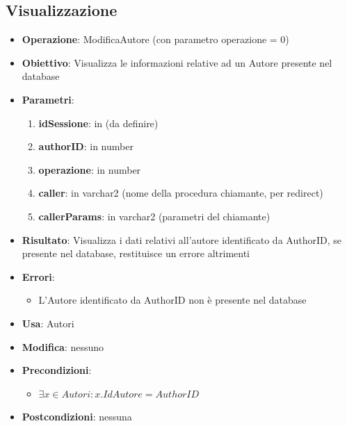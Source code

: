 \documentclass[a4paper,11pt]{article}
\begin{document}
\subsection{Visualizzazione}
\begin{itemize}
	\item \textbf{Operazione}: ModificaAutore (con parametro operazione = 0)
	\item \textbf{Obiettivo}: Visualizza le informazioni relative ad un Autore presente nel database
	\item \textbf{Parametri}:
	\begin{enumerate}
		\item \textbf{idSessione}: in (da definire)
		\item \textbf{authorID}: in number
		\item \textbf{operazione}: in number
		\item \textbf{caller}: in varchar2 (nome della procedura chiamante, per redirect)
		\item \textbf{callerParams}: in varchar2 (parametri del chiamante)
	\end{enumerate}
	\item \textbf{Risultato}: Visualizza i dati relativi all'autore identificato da AuthorID, se presente nel database, restituisce un errore altrimenti
	\item \textbf{Errori}: 
	\begin{itemize}
		\item L'Autore identificato da AuthorID non è presente nel database
	\end{itemize}
	\item \textbf{Usa}: Autori
	\item \textbf{Modifica}: nessuno
	\item \textbf{Precondizioni}:
	\begin{itemize}
		\item $\exists x \in Autori : x.IdAutore = AuthorID$
	\end{itemize}
	\item \textbf{Postcondizioni}: nessuna
\end{itemize}

\end{document}
